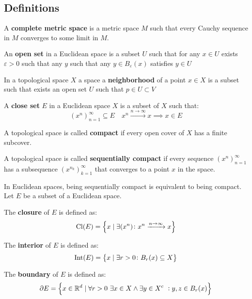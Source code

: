 \documentclass[11pt,a4paper]{article}
\begin{document}
	\newpage
	
	\subsection{Definitions}
	\begin{definition}
	A \textbf{complete metric space} is a metric space $M$ such that every
	Cauchy sequence in $M$ converges to some limit in $M$.
	\end{definition}
	\begin{definition}
	An \textbf{open set} in a Euclidean space is a subset $U$ such that
	for any $x \in U$ exists $\varepsilon > 0$ such that any $y$ such that
	any $y \in B_\varepsilon(x)$ satisfies $y \in U$
	\end{definition}
	\begin{definition}
	In a topological space $X$ a space a \textbf{neighborhood} of a point 
	$x\in X$ is a subset such that exists an open set $U$ such that 
	$p\in U\subset V$
	\end{definition}
	\begin{definition}
	A \textbf{close set} $E$ in a Euclidean space $X$ is a subset of $X$ such
	that:
	\[
		(x^n)_{n=1}^{\infty}\subseteq E \quad x^n \xrightarrow{n\to\infty} x
		\implies x \in E
	\]
	\end{definition}
	\begin{definition}
	A topological space is called \textbf{compact} if every open cover of 
	$X$ has a finite subcover.
	\end{definition}
	\begin{definition}
		A topological space is called \textbf{sequentially compact} if
		every sequence $(x^n)_{n=1}^{\infty}$ has a subsequence 
		$(x^{n_k})_{k=1}^{\infty}$ that converges to a point $x$ in the space.
	\end{definition}
	\noindent
	In Euclidean spaces, being sequentially compact is equivalent to being
	compact. Let $E$ be a subset of a Euclidean space.
	\begin{definition}
	The \textbf{closure} of $E$ is defined as:
	\[
		\mathrm{Cl}(E) = \set{x \mid \exists (x^n) \colon 
    x^n \xrightarrow{n\to\infty} x}
	\]
	\end{definition}
	\begin{definition}
	The \textbf{interior} of $E$ is defined as:
	\[
		\mathrm{Int}(E) = \set{x \mid \exists r > 0 \colon B_r(x) \subseteq X}
	\]
	\end{definition}
	\begin{definition}
	The \textbf{boundary} of $E$ is defined as:
	\[
		\partial E = \set{x \in \mathbb{R}^d \mid \forall r > 0 \
		\exists x \in X \land \exists y \in X^c\ : y,z\in B_r(x)}
	\]
	\end{definition}
\end{document}
